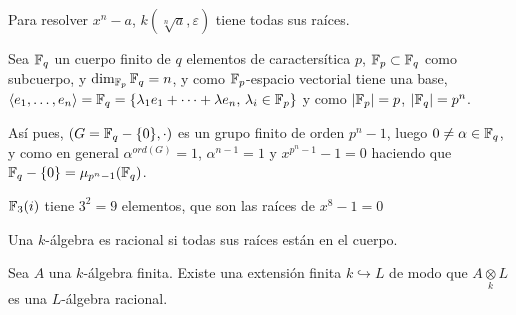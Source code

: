 Para resolver $x^n-a$, $k(\sqrt[n]{a}, \varepsilon)$ tiene todas sus ra\'ices.

Sea $\mathbb{F}_q$ un cuerpo finito de $q$ elementos de caracters\'itica $p$, $\mathbb{F}_p \subset \mathbb{F}_q$ como subcuerpo, y $\dim_{\mathbb{F}_p} \mathbb{F}_q = n$, y como $\mathbb{F}_p$-espacio vectorial tiene una base, $\langle e_1,\ldots, e_n  \rangle = \mathbb{F}_q = \{\lambda_1 e_1 + \cdots + \lambda e_n, \, \lambda_i \in \mathbb{F}_p\}$ y como $|\mathbb{F}_p| = p$, $|\mathbb{F}_q| = p^n$.

As\'i pues, $(G=\mathbb{F}_q-\{0\}, \cdot)$ es un grupo finito de orden $p^n-1$, luego $0\neq \alpha \in \mathbb{F}_q$, y como en general $\alpha^{ord(G)}=1$, $\alpha^{n-1}=1$ y $x^{p^n-1}-1=0$ haciendo que $\mathbb{F}_q - \{0\} = \mu_{p^n-1}(\mathbb{F}_q)$.

\begin{ejem}
    $\mathbb{F}_3(i)$ tiene $3^2 =9$ elementos, que son las ra\'ices de $x^8-1=0$
\end{ejem}
\begin{defi}
    Una $k$-\'algebra es racional si todas sus ra\'ices est\'an en el cuerpo.
\end{defi}
\begin{teo}
    [de Kronecker] Sea $A$ una $k$-\'algebra finita. Existe una extensi\'on finita $k\hookrightarrow L$ de modo que $A \underset{k}{\otimes} L$ es una $L$-\'algebra racional. 
\end{teo}
